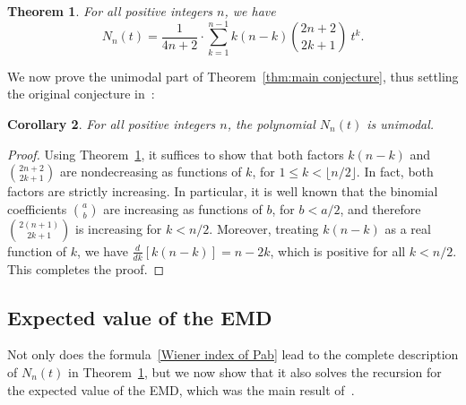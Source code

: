 \documentclass[11pt]{amsart}
\theoremstyle{plain}
\newtheorem{theorem}{Theorem}[section]
\newtheorem{corollary}[theorem]{Corollary}
\theoremstyle{definition}
\numberwithin{equation}{section}
\begin{document}
\begin{theorem}
\label{thm:coeffs of Nn}
    For all positive integers $n$, we have
    \[
    N_n(t) = \frac{1}{4n + 2} \cdot \sum_{k=1}^{n-1} k(n-k) \binom{2n+2}{2k+1} \: t^k.
    \]
\end{theorem}

We now prove the unimodal part of Theorem~\ref{thm:main conjecture}, thus settling the original conjecture in~\cite{BW}:

\begin{corollary}
\label{cor:unimodal}
    For all positive integers $n$, the polynomial $N_n(t)$ is unimodal.
\end{corollary}

\begin{proof}
    Using Theorem~\ref{thm:coeffs of Nn}, it suffices to show that both factors $k(n-k)$ and $\binom{2n+2}{2k+1}$ are nondecreasing as functions of $k$, for $1 \leq k < \lfloor n/2 \rfloor$.
    In fact, both factors are strictly increasing.
    In particular, it is well known that the binomial coefficients $\binom{a}{b}$ are increasing as functions of $b$, for $b < a/2$, and therefore $\binom{2(n+1)}{2k+1}$ is increasing for $k < n/2$.
    Moreover, treating $k(n-k)$ as a real function of $k$, we have $\frac{d}{dk} [k(n-k)] = n-2k$, which is positive for all $k < n/2$.
    This completes the proof.
\end{proof}

\subsection{Expected value of the EMD}

Not only does the formula~\eqref{Wiener index of Pab} lead to the complete description of $N_n(t)$ in Theorem~\ref{thm:coeffs of Nn}, but we now show that it also solves the recursion for the expected value of the EMD, which was the main result of~\cite{BW}.
\end{document}
